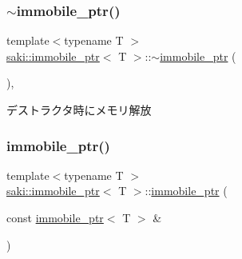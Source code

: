 \subsubsection{\texorpdfstring{$\sim$immobile\+\_\+ptr()}{~immobile\_ptr()}}
{\footnotesize\ttfamily template$<$typename T $>$ \\
\mbox{\hyperlink{classsaki_1_1immobile__ptr}{saki\+::immobile\+\_\+ptr}}$<$ T $>$\+::$\sim$\mbox{\hyperlink{classsaki_1_1immobile__ptr}{immobile\+\_\+ptr}} (\begin{DoxyParamCaption}{ }\end{DoxyParamCaption})\hspace{0.3cm}{\ttfamily [inline]}, {\ttfamily [noexcept]}}



デストラクタ時にメモリ解放 

\mbox{\label{classsaki_1_1immobile__ptr_ad0648153ed2d219d9cdf338a106de07c}} 
\subsubsection{\texorpdfstring{immobile\+\_\+ptr()}{immobile\_ptr()}\hspace{0.1cm}{\footnotesize\ttfamily [2/3]}}
{\footnotesize\ttfamily template$<$typename T $>$ \\
\mbox{\hyperlink{classsaki_1_1immobile__ptr}{saki\+::immobile\+\_\+ptr}}$<$ T $>$\+::\mbox{\hyperlink{classsaki_1_1immobile__ptr}{immobile\+\_\+ptr}} (\begin{DoxyParamCaption}\item[{const \mbox{\hyperlink{classsaki_1_1immobile__ptr}{immobile\+\_\+ptr}}$<$ T $>$ \&}]{ }\end{DoxyParamCaption})\hspace{0.3cm}{\ttfamily [delete]}}

\mbox{\label{classsaki_1_1immobile__ptr_a06b9308842f0179d5705caadd90718b0}} 
